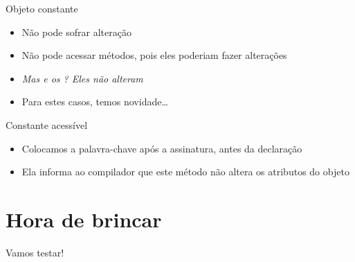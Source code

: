 \documentclass[14pt]{beamer}
\begin{document}
		\begin{frame}{Objeto constante}
			\begin{itemize}
				\presentationPause\item Não pode sofrar alteração
				\presentationPause\item Não pode acessar métodos, pois eles poderiam fazer alterações
				\presentationPause\item \textit{Mas e os ? Eles não alteram}
				\presentationPause\item Para estes casos, temos novidade\dots
			\end{itemize}
		\end{frame}

		\begin{frame}{Constante acessível}
			\presentationPause
			\begin{itemize}
				\presentationPause\item Colocamos a palavra-chave  após a assinatura, antes da declaração
				\presentationPause\item Ela informa ao compilador que este método não altera os atributos do objeto
			\end{itemize}
		\end{frame}

	\section{Hora de brincar}
		\begin{frame}
			\begin{center}\Huge
				Vamos testar!
			\end{center}
		\end{frame}
	
\end{document}
